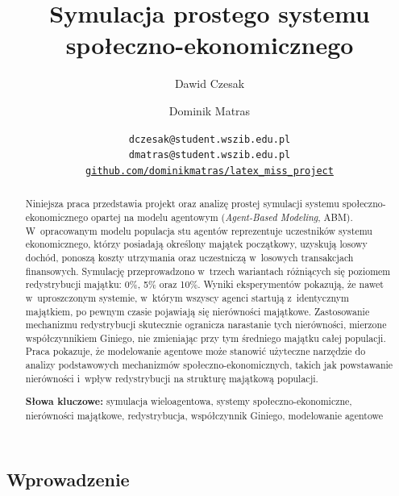 \documentclass[polish]{projectreport}
\author{Dawid Czesak \and Dominik Matras}
\title{Symulacja prostego systemu spo{\l}eczno-ekonomicznego}
\date{
    {\small \texttt{dczesak@student.wszib.edu.pl}\\[1ex]
    \texttt{dmatras@student.wszib.edu.pl}\\[2ex]
    \texttt{\href{https://github.com/dominikmatras/latex_miss_project}{github.com/dominikmatras/latex\_miss\_project}}\\[2ex]
    \the\year}
}
\begin{document}
\maketitle

\thispagestyle{empty}

\begin{abstract}
\noindent
Niniejsza praca przedstawia projekt oraz analiz\k{e} prostej symulacji systemu
spo\l{}eczno-\allowbreak ekonomicznego opartej na modelu agentowym (\emph{Agent-Based Modeling}, ABM).
W~opracowanym modelu populacja stu agent\'ow reprezentuje uczestnik\'ow systemu
ekonomicznego, kt\'orzy posiadaj\k{a} okre\'slony maj\k{a}tek pocz\k{a}tkowy, uzyskuj\k{a} losowy
doch\'od, ponosz\k{a} koszty utrzymania oraz uczestnicz\k{a} w~losowych transakcjach
finansowych. Symulacj\k{e} przeprowadzono w~trzech wariantach r\'o\.{z}ni\k{a}cych si\k{e}
poziomem redystrybucji maj\k{a}tku: 0\%, 5\% oraz 10\%. Wyniki eksperyment\'ow
pokazuj\k{a}, \.{z}e nawet w~uproszczonym systemie, w~kt\'orym wszyscy agenci startuj\k{a}
z~identycznym maj\k{a}tkiem, po pewnym czasie pojawiaj\k{a} si\k{e} nier\'owno\'sci maj\k{a}tkowe.
Zastosowanie mechanizmu redystrybucji skutecznie ogranicza narastanie tych
nier\'owno\'sci, mierzone wsp\'o\l{}czynnikiem Giniego, nie zmieniaj\k{a}c przy tym
\'sredniego maj\k{a}tku ca\l{}ej populacji. Praca pokazuje, \.{z}e modelowanie agentowe
mo\.{z}e stanowi\'{c} u\.{z}yteczne narz\k{e}dzie do analizy podstawowych mechanizm\'ow
spo\l{}eczno-\allowbreak ekonomicznych, takich jak powstawanie nier\'owno\'sci i~wp\l{}yw
redystrybucji na struktur\k{e} maj\k{a}tkow\k{a} populacji.
 
\medskip
\noindent\textbf{S\l{}owa kluczowe:} symulacja wieloagentowa, systemy spo\l{}eczno-ekonomiczne,
nier\'owno\'sci maj\k{a}tkowe, redystrybucja, wsp\'o\l{}czynnik Giniego, modelowanie agentowe
\end{abstract}

\section{\SectionTitleIntroduction}
\label{sec:introduction}

\subsection{Wprowadzenie}
\label{sec:intro}
\end{document}

